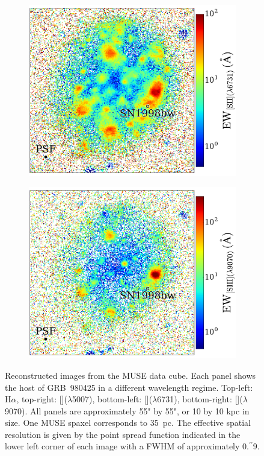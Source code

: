 \documentclass[traditabstract]{aa}
\newcommand{\farc}{\hbox{$.\!\!^{\prime\prime}$}}
\newcommand{\ha}{H$\alpha$}
\newcommand{\sii}{[\ion{S}{ii}]}
\newcommand{\siii}{[\ion{S}{iii}]}
\newcommand{\oiii}{[\ion{O}{iii}]}
\begin{document}
\begin{figure}
\begin{subfigure}{.24\textwidth}
\end{subfigure}
\begin{subfigure}{.24\textwidth}
  \includegraphics[width=1.0\linewidth]{Figs/MUSE_SN1998bw_SIIEW.pdf}
\end{subfigure}
\begin{subfigure}{.24\textwidth}
  \includegraphics[width=1.0\linewidth]{Figs/MUSE_SN1998bw_SIIIEW.pdf}
\end{subfigure}
\caption{Reconstructed images from the MUSE data cube. Each panel shows the host of GRB~980425 in a different wavelength regime. Top-left: \ha, top-right: \oiii($\lambda$5007), bottom-left: \sii($\lambda$6731), bottom-right: \siii($\lambda$9070). All panels are approximately 55" by 55", or 10 by 10 kpc in size. One MUSE spaxel corresponds to 35~pc. The effective spatial resolution is given by the point spread function indicated in the lower left corner of each image with a FWHM of approximately 0\farc{9}.}
\label{fig:EW}
\end{figure}
\end{document}

